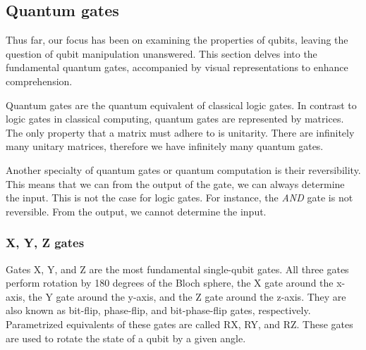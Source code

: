 \subsection*{Quantum gates}
Thus far, our focus has been on examining the properties of qubits, leaving the question of qubit manipulation unanswered. This section delves into the fundamental quantum gates, accompanied by visual representations to enhance comprehension.

Quantum gates are the quantum equivalent of classical logic gates. In contrast to logic gates in classical computing, quantum gates are represented by matrices. The only property that a matrix must adhere to is unitarity. There are infinitely many unitary matrices, therefore we have infinitely many quantum gates.

Another specialty of quantum gates or quantum computation is their reversibility. This means that we can from the output of the gate, we can always determine the input. This is not the case for logic gates. For instance, the \textit{AND} gate is not reversible. From the output, we cannot determine the input.

\subsubsection*{X, Y, Z gates}
Gates X, Y, and Z are the most fundamental single-qubit gates. All three gates perform rotation by 180 degrees of the Bloch sphere, the X gate around the x-axis, the Y gate around the y-axis, and the Z gate around the z-axis. They are also known as bit-flip, phase-flip, and bit-phase-flip gates, respectively. Parametrized equivalents of these gates are called RX, RY, and RZ. These gates are used to rotate the state of a qubit by a given angle.

